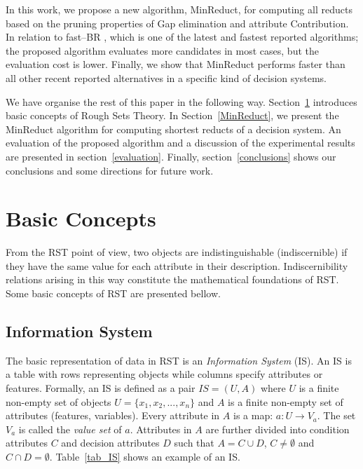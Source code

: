 \documentclass[authoryear,preprint,review,12pt]{elsarticle}
\begin{document}
  In this work, we propose a new algorithm, MinReduct, for computing all reducts based on the pruning properties of Gap elimination and attribute Contribution. 
  In relation to fast--BR \citep{Lias13}, which is one of the latest and fastest reported algorithms; the proposed algorithm evaluates more candidates in most cases, but the evaluation cost is lower. Finally, we show that MinReduct performs faster than all other recent reported alternatives in a specific kind of decision systems. 
  
  We have organise the rest of this paper in the following way. Section~\ref{basicConcepts} introduces basic concepts of Rough Sets Theory.  In Section~\ref{MinReduct}, we present the MinReduct algorithm for computing shortest reducts of a decision system. An evaluation of the proposed algorithm and a discussion of the experimental results are presented in section~\ref{evaluation}. Finally, section~\ref{conclusions} shows our conclusions and some directions for future work.
   
\section{Basic Concepts}\label{basicConcepts}
  From the RST point of view, two objects are indistinguishable (indiscernible) if they have the same value for each attribute in their description. Indiscernibility relations arising in this way constitute the mathematical foundations of RST. Some basic concepts of RST are presented bellow.
  
\subsection{Information System}
  The basic representation of data in RST is an \emph{Information System} (IS). An IS is a table with rows
  representing objects while columns specify attributes or features. Formally, an IS is defined as a pair
  $IS=(U,A)$ where $U$ is a finite non-empty set of objects $U=\lbrace x_1,x_2,...,x_n\rbrace$ and $A$ is a 
  finite non-empty set
  of attributes (features, variables). Every attribute in $A$ is a map: $a: U \rightarrow V_a$. The set $V_a$ is
  called the \textit{value set} of $a$. Attributes in $A$ are further divided into condition attributes $C$ and 
  decision attributes $D$ such that $A=C \cup D$, $C \neq \emptyset$ and $C \cap D =\emptyset$. 
  Table~\ref{tab_IS} shows an example of an IS.
  
\end{document}
